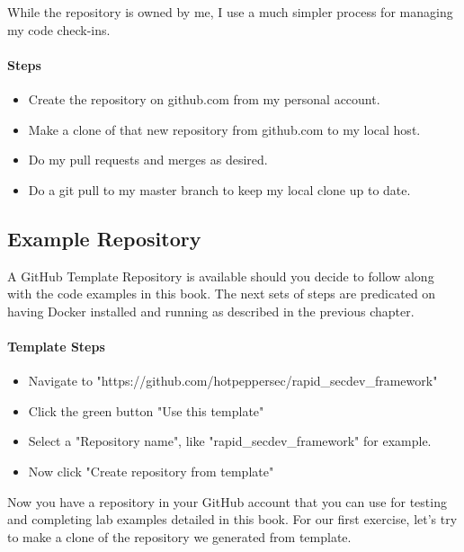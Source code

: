 \justify
While the repository is owned by me, I use a much simpler process for
managing my code check-ins.

\hypertarget{steps-2}{%
      \paragraph{Steps}\label{steps-2}}

\begin{itemize}

      \item
            Create the repository on github.com from my personal account.
      \item
            Make a clone of that new repository from github.com to my local host.
      \item
            Do my pull requests and merges as desired.
      \item
            Do a git pull to my master branch to keep my local clone up to date.
\end{itemize}


\subsection{Example Repository}

\justify
A GitHub Template Repository is available should you decide to follow
along with the code examples in this book. The next sets of steps are
predicated on having Docker installed and running as described in the
previous chapter.


\paragraph{Template Steps}

\begin{itemize}

      \item
            Navigate to "https://github.com/hotpeppersec/rapid\_secdev\_framework"
      \item
            Click the green button "Use this template"
      \item
            Select a "Repository name", like "rapid\_secdev\_framework" for
            example.
      \item
            Now click "Create repository from template"
\end{itemize}

\justify
Now you have a repository in your GitHub account that you can use for
testing and completing lab examples detailed in this book. For our first
exercise, let's try to make a clone of the repository we generated from
template.


